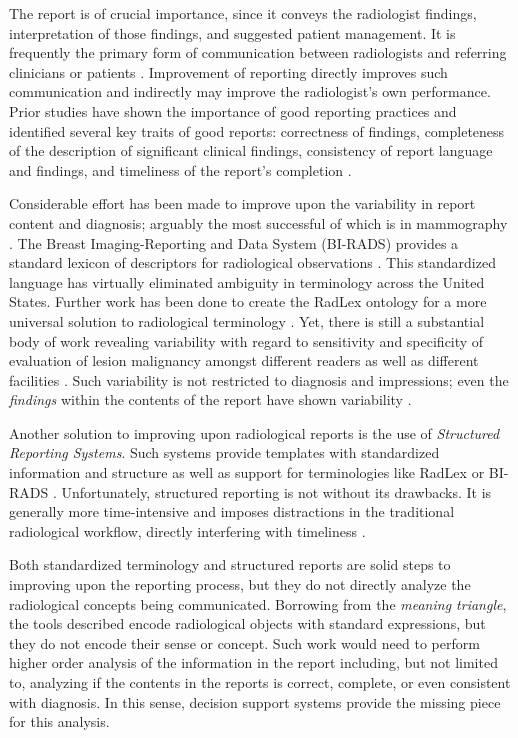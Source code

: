 The report is of crucial importance, since it conveys the radiologist findings, interpretation of those findings, and suggested patient management. It is frequently the primary form of communication between radiologists and referring clinicians or patients \cite{Sistrom:2005cx}. Improvement of reporting directly improves such communication and indirectly may improve the radiologist's own performance. Prior studies have shown the importance of good reporting practices and identified several key traits of good reports: correctness of findings, completeness of the description of significant clinical findings, consistency of report language and findings, and timeliness of the report's completion \cite{Johnson:2004kh, HaraldO:2004hi}.

Considerable effort has been made to improve upon the variability in report content and diagnosis; arguably the most successful of which is in mammography \cite{Langlotz:2009fn,Burnside:2009ki}. The Breast Imaging-Reporting and Data System (BI-RADS) provides a standard lexicon of descriptors for radiological observations \cite{Liberman:ws}. This standardized language has virtually eliminated ambiguity in terminology across the United States. Further work has been done to create the RadLex ontology for a more universal solution to radiological terminology \cite{Langlotz:2006jn}. Yet, there is still a substantial body of work revealing variability with regard to sensitivity and specificity of evaluation of lesion malignancy amongst different readers as well as different facilities \cite{Jackson:2009fw, Beam:1996ui, Elmore:2002vc, Taplin:2008bv}. Such variability is not restricted to diagnosis and impressions; even the \emph{findings} within the contents of the report have shown variability \cite{Hobby:2000th, Robinson:1997uq}.

Another solution to improving upon radiological reports is the use of \emph{Structured Reporting Systems}. Such systems provide templates with standardized information and structure as well as support for terminologies like RadLex or BI-RADS \cite{Reiner:2009ib}. Unfortunately, structured reporting is not without its drawbacks. It is generally more time-intensive and imposes distractions in the traditional radiological workflow, directly interfering with timeliness \cite{Weiss:2008er}.

Both standardized terminology and structured reports are solid steps to improving upon the reporting process, but they do not directly analyze the radiological concepts being communicated. Borrowing from the \emph{meaning triangle}, the tools described encode radiological objects with standard expressions, but they do not encode their sense or concept. Such work would need to perform higher order analysis of the information in the report including, but not limited to, analyzing if the contents in the reports is correct, complete, or even consistent with diagnosis. In this sense, decision support systems provide the missing piece for this analysis.

